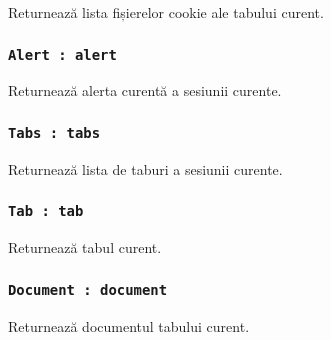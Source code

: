 Returnează lista fișierelor cookie ale tabului curent.

\subsubsection{\texttt{Alert : alert}}

Returnează alerta curentă a sesiunii curente.

\subsubsection{\texttt{Tabs : tabs}}

Returnează lista de taburi a sesiunii curente.

\subsubsection{\texttt{Tab : tab}}

Returnează tabul curent.

\subsubsection{\texttt{Document : document}}

Returnează documentul tabului curent.

